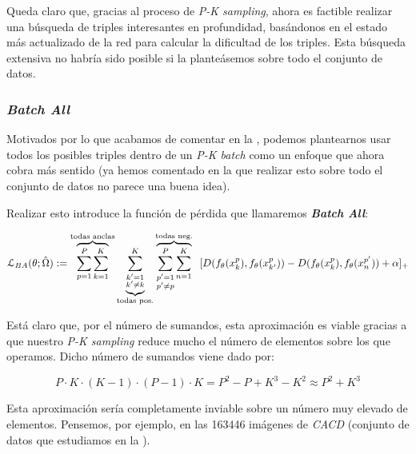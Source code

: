 Queda claro que, gracias al proceso de \textit{P-K sampling}, ahora es factible realizar una búsqueda de triples interesantes en profundidad, basándonos en el estado más actualizado de la red para calcular la dificultad de los triples. Esta búsqueda extensiva no habría sido posible si la planteásemos sobre todo el conjunto de datos.

\subsubsection{\textit{Batch All}} \label{isubsubs:batch_all}

Motivados por lo que acabamos de comentar en la , podemos plantearnos usar todos los posibles triples dentro de un \textit{P-K batch} como un enfoque que ahora cobra más sentido (ya hemos comentado en la  que realizar esto sobre todo el conjunto de datos no parece una buena idea).

Realizar esto introduce la función de pérdida que llamaremos \textbf{\textit{Batch All}}:

\begin{equation} \label{ieq:batch_all}
    \mathcal{L}_{BA}(\theta; \hat{\Omega}) :=
    \overbrace{\sum_{p = 1}^{P} \sum_{k = 1}^K}^\textrm{\text{todas anclas}}
    \underbrace{\sum_{\substack{k' = 1 \\ k' \neq k}}^{K}}_\textrm{\text{todas pos.}}
    \overbrace{\sum_{\substack{p' = 1 \\ p' \neq p}}^P \sum_{n = 1}^K}^\textrm{\text{todas neg.}} \ \ [
        D(f_{\theta}(x_k^p),f_{\theta}(x_{k'}^p)) - D(f_{\theta}(x_k^p),f_{\theta}(x_{n}^{p'})) + \alpha
    ]_+
\end{equation}

Está claro que, por el número de sumandos, esta aproximación es viable gracias a que nuestro \textit{P-K sampling} reduce mucho el número de elementos sobre los que operamos. Dicho número de sumandos viene dado por:

\begin{equation}
    P \cdot K \cdot (K - 1) \cdot (P - 1) \cdot K = P^2 - P + K^3 - K^2 \approx P^2 + K^3
\end{equation}

Esta aproximación sería completamente inviable sobre un número muy elevado de elementos. Pensemos, por ejemplo, en las 163446 imágenes de \textit{CACD} (conjunto de datos que estudiamos en la ).

